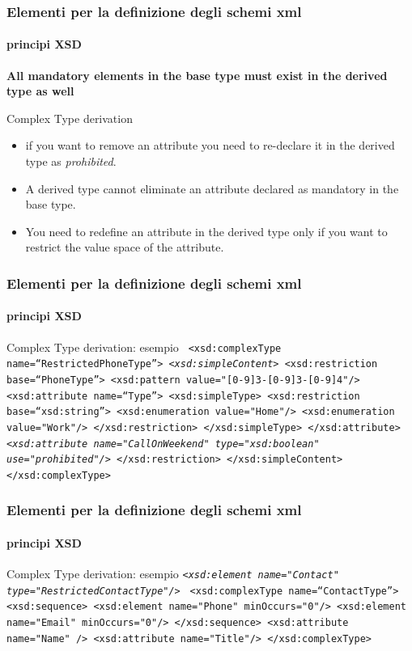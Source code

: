 \begin{frame}
	\frametitle{Elementi per la definizione degli schemi xml}
	\framesubtitle{principi XSD}
	\addtocounter{nframe}{1}

	
		\textbf{All mandatory elements in the base type must exist in the derived type as well}
	

	\begin{block}{Complex Type derivation}
		\begin{itemize}
			\item if you want to remove an attribute you need to re-declare it in the derived type as \textit{prohibited}.
			\item A derived type cannot eliminate an attribute declared as mandatory in the base type.
			\item You need to redefine an attribute in the derived type only if you want to restrict the value space of the attribute.
		\end{itemize}
	\end{block}
\end{frame}



\begin{frame}
	\frametitle{Elementi per la definizione degli schemi xml}
	\framesubtitle{principi XSD}
	\addtocounter{nframe}{1}

	\begin{block}{Complex Type derivation: esempio}
		\texttt{
		<xsd:complexType name=``RestrictedPhoneType''>
		\emph{<xsd:simpleContent>}
		<xsd:restriction base=``PhoneType''>
		<xsd:pattern value="[0-9]{3}-[0-9]{3}-[0-9]{4}"/>
		<xsd:attribute name=``Type''>
		<xsd:simpleType>
		<xsd:restriction base=``xsd:string''>
		<xsd:enumeration value="Home"/>
		<xsd:enumeration value="Work"/>
		</xsd:restriction>
		</xsd:simpleType>
		</xsd:attribute>
		\textit{<xsd:attribute name="CallOnWeekend" type="xsd:boolean" use="prohibited"/> }
		</xsd:restriction>
		</xsd:simpleContent>
		</xsd:complexType>
		}
	\end{block}
\end{frame}

\begin{frame}
	\frametitle{Elementi per la definizione degli schemi xml}
	\framesubtitle{principi XSD}
	\addtocounter{nframe}{1}

	\begin{block}{Complex Type derivation: esempio}
		\texttt{\emph{<xsd:element name="Contact" type="RestrictedContactType"/>}}
		\texttt{
			<xsd:complexType name=``ContactType''>
			<xsd:sequence>
			<xsd:element name="Phone" minOccurs="0"/>
			<xsd:element name="Email" minOccurs="0"/>
			</xsd:sequence>
			<xsd:attribute name="Name" />
			<xsd:attribute name="Title"/>
			</xsd:complexType>}
	\end{block}
\end{frame}

